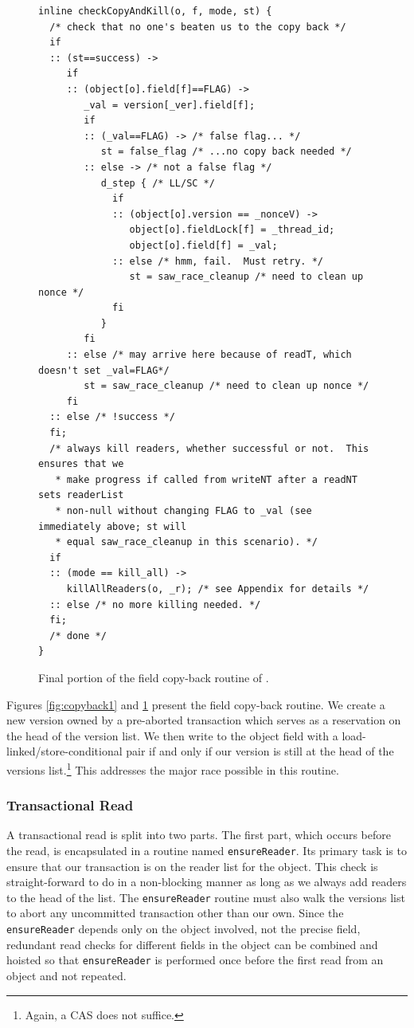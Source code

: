 \begin{figure}\sis\fontsize{9}{10}
\begin{verbatim}
inline checkCopyAndKill(o, f, mode, st) {
  /* check that no one's beaten us to the copy back */
  if
  :: (st==success) ->
     if
     :: (object[o].field[f]==FLAG) ->
        _val = version[_ver].field[f];
        if
        :: (_val==FLAG) -> /* false flag... */
           st = false_flag /* ...no copy back needed */
        :: else -> /* not a false flag */
           d_step { /* LL/SC */
             if
             :: (object[o].version == _nonceV) ->
                object[o].fieldLock[f] = _thread_id;
                object[o].field[f] = _val;
             :: else /* hmm, fail.  Must retry. */
                st = saw_race_cleanup /* need to clean up nonce */
             fi
           }
        fi
     :: else /* may arrive here because of readT, which doesn't set _val=FLAG*/
        st = saw_race_cleanup /* need to clean up nonce */
     fi
  :: else /* !success */
  fi;
  /* always kill readers, whether successful or not.  This ensures that we
   * make progress if called from writeNT after a readNT sets readerList
   * non-null without changing FLAG to _val (see immediately above; st will
   * equal saw_race_cleanup in this scenario). */
  if
  :: (mode == kill_all) ->
     killAllReaders(o, _r); /* see Appendix for details */
  :: else /* no more killing needed. */
  fi;
  /* done */
}
\end{verbatim}
\caption[Final portion of the field copy-back routine.]
 {Final portion of the field copy-back routine of .}
\label{fig:copyback2}
\end{figure}
Figures \ref{fig:copyback1} and \ref{fig:copyback2} present the field copy-back routine.  We create a
new version owned by a pre-aborted transaction which serves as a
reservation on the head of the version list.  We then write to the
object field with a load-linked/store-conditional pair if and only if
our version is still at the head of the versions list.\footnote{Again,
  a CAS does not suffice.}  This addresses
the major race possible in this routine.

\subsubsection{Transactional Read}\label{sec:readT}
A transactional read is split into two parts.  The first part, which
occurs before the read, is encapsulated in a routine named
\texttt{ensureReader}.  Its primary task is to
ensure that our transaction is on the reader list for the
object.  This check is straight-forward to do in a non-blocking manner as
long as we always add readers to the head of the list.  The
\texttt{ensureReader} routine must also
walk the versions list to abort any uncommitted transaction other
than our own.  Since the \texttt{ensureReader} depends only on the
object involved, not the precise field, redundant read checks for
different fields in the object can be combined and hoisted so that 
\texttt{ensureReader} is performed
once before the first read from an object and not repeated.

